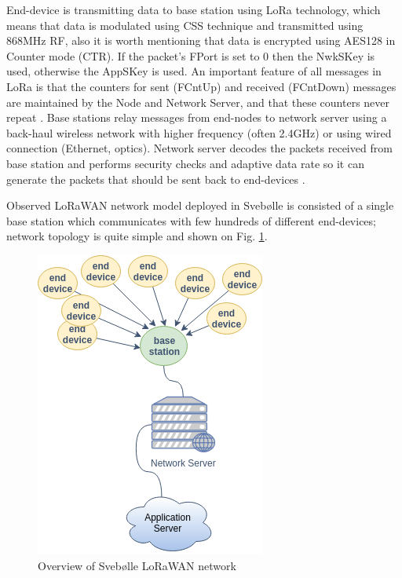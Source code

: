 \documentclass[11pt, a4paper]{article} %
\begin{document}
End-device is transmitting data to base station using LoRa technology, which means that data is modulated using CSS technique and transmitted using 868MHz RF, also it is worth mentioning that data is encrypted using AES128 in Counter mode (CTR). If the packet’s FPort is set to 0 then the NwkSKey is used, otherwise the AppSKey is used. An important feature of all messages in LoRa is that the counters for sent (FCntUp) and received (FCntDown) messages are maintained by the Node and Network Server, and that these counters never repeat \cite{Miller_LoRaSecurity}.
Base stations relay messages from end-nodes to network server using a back-haul wireless network with higher frequency (often 2.4GHz) or using wired connection (Ethernet, optics). 
Network server decodes the packets received from base station and performs security checks and adaptive data rate so it can generate the packets that should be sent back to end-devices \cite{Silva_LoRaWAN}.

Observed LoRaWAN network model deployed in Svebølle is consisted of a single base station which communicates with few hundreds of different end-devices; network topology is quite simple and shown on Fig. \ref{svebolle}.
\begin{figure}
	\centering
	\includegraphics[scale=.7]{images/Svebolle-Topology.png} %
	\caption{Overview of Svebølle LoRaWAN network} %
	\label{svebolle} 
\end{figure}
\end{document}
